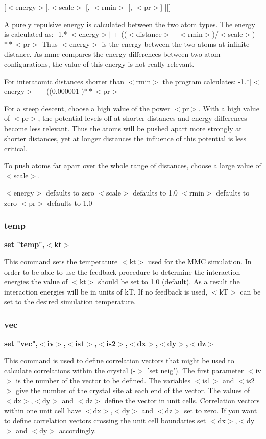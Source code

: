                               [$ <$energy$> $[,$ <$scale$> $ [, $ <$rmin$> $ [, $ <$pr$> $] ]]] 
\par
A purely repulsive energy is calculated between the two atom types. 
The energy is calculated as: 
-1.*$| $$ <$energy$> $$| $ + (($ <$distance$> $ - $ <$rmin$> $)/$ <$scale$> $)$**$$ <$pr$> $ 
Thus $ <$energy$> $ is the energy between the two atoms at infinite distance. 
As mmc compares the energy differences between two atom configurations, 
the value of this energy is not really relevant. 
\par
For interatomic distances shorter than $ <$rmin$> $ the program calculates: 
-1.*$| $$ <$energy$> $$| $ + ((0.000001                    )$**$$ <$pr$> $ 
\par
For a steep descent, choose a high value of the power $ <$pr$> $. With a 
high value of $ <$pr$> $, the potential levels off at shorter distances 
and energy differences become less relevant. Thus the atoms will be 
pushed apart more strongly at shorter distances, yet at longer 
distances the influence of this potential is less critical. 
\par
To push atoms far apart over the whole range of distances, choose a 
large value of $ <$scale$> $. 
\par
$ <$energy$> $ defaults to zero 
$ <$scale$> $  defaults to 1.0 
$ <$rmin$> $   defaults to zero 
$ <$pr$> $     defaults to 1.0 
\subsubsection{temp}
{\bf set "temp",$ <$kt$> $ \par }
\par
\vspace{3pt}
This command sets the temperature $ <$kt$> $ used for the MMC simulation. 
In order to be able to use the feedback procedure to determine the 
interaction energies the value of $ <$kt$> $ should be set to 1.0 (default). 
As a result the interaction energies will be in units of kT. If no 
feedback is used, $ <$kT$> $ can be set to the desired simulation temperature. 
\subsubsection{vec}
{\bf set "vec",$ <$iv$> $,$ <$is1$> $,$ <$is2$> $,$ <$dx$> $,$ <$dy$> $,$ <$dz$> $ \par }
\par
\vspace{3pt}
This command is used to define correlation vectors that might be used 
to calculate correlations within the crystal (-$> $ 'set neig'). The 
first parameter $ <$iv$> $ is the number of the vector to be defined. The 
variables $ <$is1$> $ and $ <$is2$> $ give the number of the crystal site at each 
end of the vector. The values of $ <$dx$> $,$ <$dy$> $ and $ <$dz$> $ define the vector 
in unit cells. Correlation vectors within one unit cell have $ <$dx$> $,$ <$dy$> $ 
and $ <$dz$> $ set to zero. If you want to define correlation vectors crossing 
the unit cell boundaries set $ <$dx$> $,$ <$dy$> $ and $ <$dy$> $ accordingly. 
